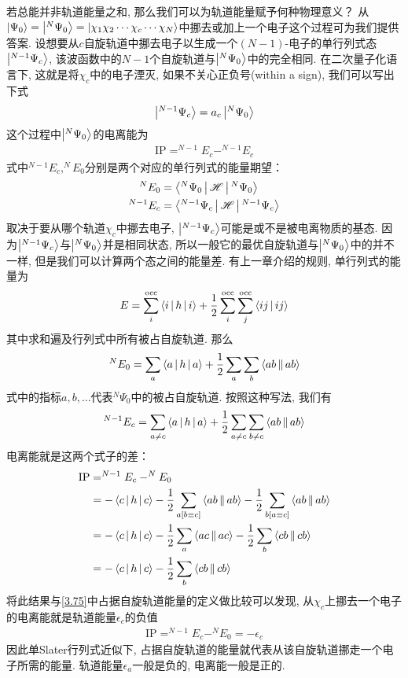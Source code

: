 若总能并非轨道能量之和, 
那么我们可以为轨道能量赋予何种物理意义？
从$\Ket{\Psi_0}=\Ket{^N\Psi_0}=\Ket{\chi_1\chi_2\cdots\chi_c\cdots\chi_N}$中挪去或加上一个电子这个过程可为我们提供答案. 
设想要从$c$自旋轨道中挪去电子以生成一个$(N-1)$-电子的单行列式态$\Ket{^{N-1}\Psi_c}$, 
该波函数中的$N-1$个自旋轨道与$\Ket{^N\Psi_0}$中的完全相同. 
在二次量子化语言下, 
这就是将$\chi_c$中的电子湮灭, 
如果不关心正负号(within a sign), 
我们可以写出下式
\begin{align}
	\Ket{^{N-1}\Psi_c} = a_c\Ket{^N\Psi_0}
\end{align}
这个过程中$\Ket{^N\Psi_0}$的电离能为
\begin{align}
	\mathrm{IP} = ^{N-1}E_c - ^{N-1}E_c
\end{align}
式中$^{N-1}E_c,^{N}E_0$分别是两个对应的单行列式的能量期望：
\begin{align}
	^{N}E_0  & = \Braket{^N\Psi_0|\mathscr{H}|^N\Psi_0}\\
	^{N-1}E_c&= \Braket{^{N-1}\Psi_c|\mathscr{H}|^{N-1}\Psi_c}
\end{align}
取决于要从哪个轨道$\chi_c$中挪去电子, 
$\Ket{^{N-1}\Psi_c}$可能是或不是被电离物质的基态. 
因为$\Ket{^{N-1}\Psi_c}$与$\Ket{^N\Psi_0}$并是相同状态, 
所以一般它的最优自旋轨道与$\Ket{^N\Psi_0}$中的并不一样, 
但是我们可以计算两个态之间的能量差. 
有上一章介绍的规则, 
单行列式的能量为
\begin{align}
	\label{3.87}
	E = \sum_i^\mathrm{occ} \Braket{i|h|i} + \frac{1}{2}\sum^\mathrm{occ}_i\sum^\mathrm{occ}_j\Braket{ij|ij}
\end{align}
其中求和遍及行列式中所有被占自旋轨道. 
那么
\begin{align}
	\label{3.88}
	^NE_0 = \sum_a\Braket{a|h|a} + \frac{1}{2}\sum_a\sum_b\Braket{ab||ab}
\end{align}
式中的指标$a,b,\ldots$代表$^N\Psi_0$中的被占自旋轨道. 
按照这种写法, 
我们有
\begin{align}
	^{N-1}E_c = \sum_{a\neq c}\Braket{a|h|a} + \frac{1}{2}\sum_{a\neq c}\sum_{b\neq c}\Braket{ab||ab}
\end{align}
电离能就是这两个式子的差：
\begin{align}
	\mathrm{IP} & = ^{N-1}E_c - ^NE_0\notag\\
	& = -\Braket{c|h|c} - \frac{1}{2}\sum_{a[b\equiv c]}\Braket{ab||ab}- \frac{1}{2}\sum_{b[a\equiv c]}\Braket{ab||ab}\notag\\
	& = -\Braket{c|h|c} - \frac{1}{2}\sum_{a}\Braket{ac||ac}- \frac{1}{2}\sum_{b}\Braket{cb||cb}\notag\\
	& = -\Braket{c|h|c} - \frac{1}{2}\sum_{b}\Braket{cb||cb}
\end{align}
将此结果与\eqref{3.75}中占据自旋轨道能量的定义做比较可以发现, 
从$\chi_c$上挪去一个电子的电离能就是轨道能量$\epsilon_c$的负值
\begin{align}
	\mathrm{IP} = ^{N-1}E_c - ^NE_0 = -\epsilon_c
\end{align}
因此单Slater行列式近似下, 
占据自旋轨道的能量就代表从该自旋轨道挪走一个电子所需的能量. 
轨道能量$\epsilon_a$一般是负的, 
电离能一般是正的.


